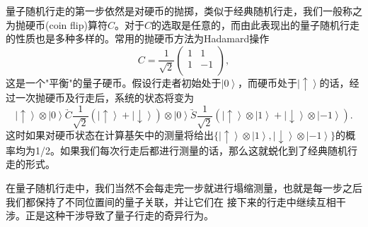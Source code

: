 量子随机行走的第一步依然是对硬币的抛掷，类似于经典随机行走，我们一般称之为抛硬币(coin flip)算符$C$。对于$C$的选取是任意的，而由此表现出的量子随机行走的性质也是多种多样的。常用的抛硬币方法为Hadamard操作
\begin{equation}
          C = \frac{1}{\sqrt{2}}\left(
                \begin{array}{cc}
                  1 & 1 \\
                  1& -1 \\
                \end{array}
              \right),
\end{equation}
这是一个"平衡"的量子硬币。假设行走者初始处于$\left\vert 0 \right \rangle$，而硬币处于$\left\vert\uparrow \right \rangle$的话，经过一次抛硬币及行走后，系统的状态将变为
\begin{equation}
          \left\vert \uparrow \right \rangle \otimes\left\vert 0 \right \rangle \underrightarrow{C}  \frac{1}{\sqrt{2}}(\left\vert \uparrow \right \rangle +\left\vert \downarrow \right \rangle) \otimes\left\vert 0 \right \rangle
          \underrightarrow{S} \frac{1}{\sqrt{2}}(\left\vert \uparrow \right \rangle \otimes  \left\vert 1 \right \rangle + \left\vert \downarrow \right \rangle \otimes \left\vert -1 \right \rangle).
\end{equation}
这时如果对硬币状态在计算基矢中的测量将给出$\{\left\vert \uparrow \right \rangle \otimes  \left\vert 1 \right \rangle,  \left\vert \downarrow \right \rangle \otimes \left\vert -1 \right \rangle\}$的概率均为1/2。如果我们每次行走后都进行测量的话，那么这就蜕化到了经典随机行走的形式。

在量子随机行走中，我们当然不会每走完一步就进行塌缩测量，也就是每一步之后我们都保持了不同位置间的量子关联，并让它们在
接下来的行走中继续互相干涉。正是这种干涉导致了量子行走的奇异行为。


